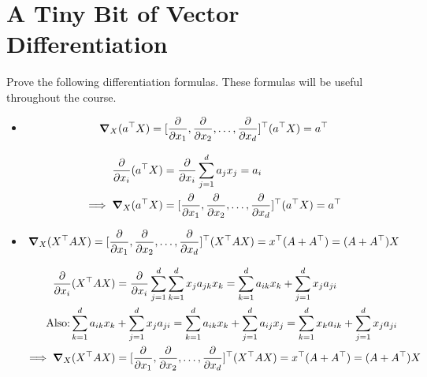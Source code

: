 \documentclass[12pt]{article}
\begin{document}
\section{A Tiny Bit of Vector Differentiation}
Prove the following differentiation formulas. These formulas will be useful throughout the course.
\begin{itemize}
    \item \begin{align*}
              \gradient_X (a^\top X ) = [\frac{\partial}{\partial x_1} , \frac{\partial}{\partial x_2} , \ldots , \frac{\partial}{\partial x_d} ]^\top (a^\top X) = a^\top
          \end{align*}
          \begin{qsolve}
              \begin{align*}
                  \frac{\partial}{\partial x_i} (a^\top X) & = \frac{\partial}{\partial x_i} \sum_{j=1}^d a_j x_j = a_i                                                                           \\
                  \implies \gradient_X (a^\top X)          & = [\frac{\partial}{\partial x_1} , \frac{\partial}{\partial x_2} , \ldots , \frac{\partial}{\partial x_d} ]^\top (a^\top X) = a^\top
              \end{align*}
          \end{qsolve}
    \item \begin{align*}
              \gradient_X (X^\top A X) = [\frac{\partial}{\partial x_1} , \frac{\partial}{\partial x_2} , \ldots , \frac{\partial}{\partial x_d} ]^\top (X^\top A X) = x^\top (A + A^\top) = (A + A^\top) X
          \end{align*}
          \begin{qsolve}
              \begin{align*}
                  \frac{\partial}{\partial x_i} (X^\top A X) & = \frac{\partial}{\partial x_i} \sum_{j=1}^d \sum_{k=1}^d x_j a_{jk} x_k = \sum_{k=1}^d a_{ik} x_k + \sum_{j=1}^d x_j a_{ji}                                         \\
                  \text{Also:} \sum_{k=1}^d a_{ik} x_k       & + \sum_{j=1}^d x_j a_{ji}  = \sum_{k=1}^d a_{ik} x_k + \sum_{j=1}^d a_{ij} x_j = \sum_{k=1}^d  x_k a_{ik} + \sum_{j=1}^d x_j a_{ji}                                  \\
                  \implies \gradient_X (X^\top A X)          & = [\frac{\partial}{\partial x_1} , \frac{\partial}{\partial x_2} , \ldots , \frac{\partial}{\partial x_d} ]^\top (X^\top A X) = x^\top (A + A^\top) = (A + A^\top) X
              \end{align*}
          \end{qsolve}
\end{itemize}

\makeendpage
\end{document}

